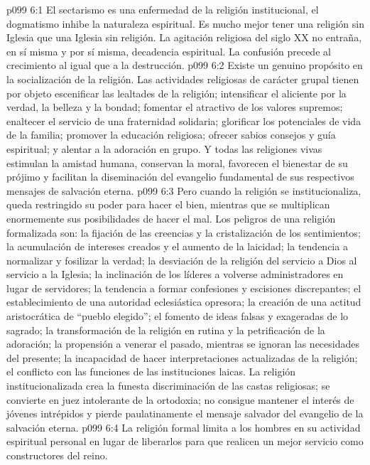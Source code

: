 \vs p099 6:1 El sectarismo es una enfermedad de la religión institucional, el dogmatismo inhibe la naturaleza espiritual. Es mucho mejor tener una religión sin Iglesia que una Iglesia sin religión. La agitación religiosa del siglo XX no entraña, en sí misma y por sí misma, decadencia espiritual. La confusión precede al crecimiento al igual que a la destrucción.
\vs p099 6:2 Existe un genuino propósito en la socialización de la religión. Las actividades religiosas de carácter grupal tienen por objeto escenificar las lealtades de la religión; intensificar el aliciente por la verdad, la belleza y la bondad; fomentar el atractivo de los valores supremos; enaltecer el servicio de una fraternidad solidaria; glorificar los potenciales de vida de la familia; promover la educación religiosa; ofrecer sabios consejos y guía espiritual; y alentar a la adoración en grupo. Y todas las religiones vivas estimulan la amistad humana, conservan la moral, favorecen el bienestar de su prójimo y facilitan la diseminación del evangelio fundamental de sus respectivos mensajes de salvación eterna.
\vs p099 6:3 Pero cuando la religión se institucionaliza, queda restringido su poder para hacer el bien, mientras que se multiplican enormemente sus posibilidades de hacer el mal. Los peligros de una religión formalizada son: la fijación de las creencias y la cristalización de los sentimientos; la acumulación de intereses creados y el aumento de la laicidad; la tendencia a normalizar y fosilizar la verdad; la desviación de la religión del servicio a Dios al servicio a la Iglesia; la inclinación de los líderes a volverse administradores en lugar de servidores; la tendencia a formar confesiones y escisiones discrepantes; el establecimiento de una autoridad eclesiástica opresora; la creación de una actitud aristocrática de “pueblo elegido”; el fomento de ideas falsas y exageradas de lo sagrado; la transformación de la religión en rutina y la petrificación de la adoración; la propensión a venerar el pasado, mientras se ignoran las necesidades del presente; la incapacidad de hacer interpretaciones actualizadas de la religión; el conflicto con las funciones de las instituciones laicas. La religión institucionalizada crea la funesta discriminación de las castas religiosas; se convierte en juez intolerante de la ortodoxia; no consigue mantener el interés de jóvenes intrépidos y pierde paulatinamente el mensaje salvador del evangelio de la salvación eterna.
\vs p099 6:4 La religión formal limita a los hombres en su actividad espiritual personal en lugar de liberarlos para que realicen un mejor servicio como constructores del reino.
